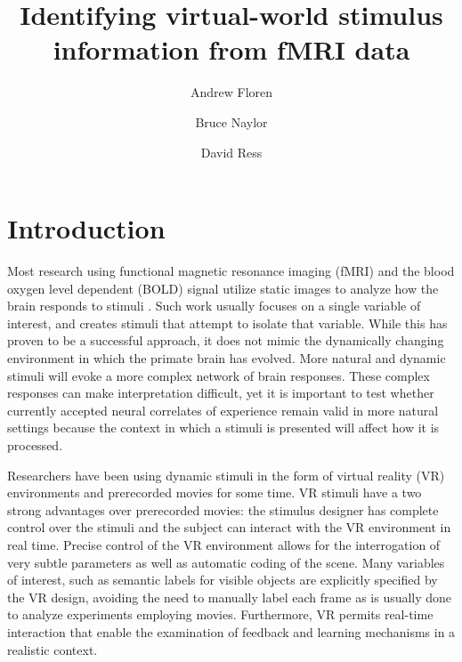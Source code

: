 \documentclass[authoryear]{elsarticle}
\begin{document}
\begin{frontmatter}

\title{Identifying virtual-world stimulus information from fMRI data}

\author[UT]{Andrew Floren}

\author[UT]{Bruce Naylor}

\author[UT]{David Ress}

\address[UT]{The University of Texas at Austin, Austin, TX 78712 USA}



\end{frontmatter}

\section{Introduction}
Most research using functional magnetic resonance imaging (fMRI) and the blood oxygen level dependent (BOLD) signal utilize static images to analyze how the brain responds to stimuli \citep{traditionalfmri}.
Such work usually focuses on a single variable of interest, and creates stimuli that attempt to isolate that variable.
While this has proven to be a successful approach, it does not mimic the dynamically changing environment in which the primate brain has evolved.
More natural and dynamic stimuli will evoke a more complex network of brain responses.
These complex responses can make interpretation difficult, yet it is important to test whether currently accepted neural correlates of experience remain valid in more natural settings because the context in which a stimuli is presented will affect how it is processed.

Researchers have been using dynamic stimuli in the form of virtual reality (VR) environments \citep{Maguire1998,Calhoun2002,King2006,Mathiak2006,Spiers2007a,Hassabis2009} and prerecorded movies \citep{Hasson2004,Chadwick2010,Nishimoto2011} for some time.
VR stimuli have a two strong advantages over prerecorded movies: the stimulus designer has complete control over the stimuli and the subject can interact with the VR environment in real time.
Precise control of the VR environment allows for the interrogation of very subtle parameters as well as automatic coding of the scene.
Many variables of interest, such as semantic labels for visible objects are explicitly specified by the VR design, avoiding the need to manually label each frame as is usually done to analyze experiments employing movies.
Furthermore, VR permits real-time interaction that enable the examination of feedback and learning mechanisms in a realistic context.
\end{document}
